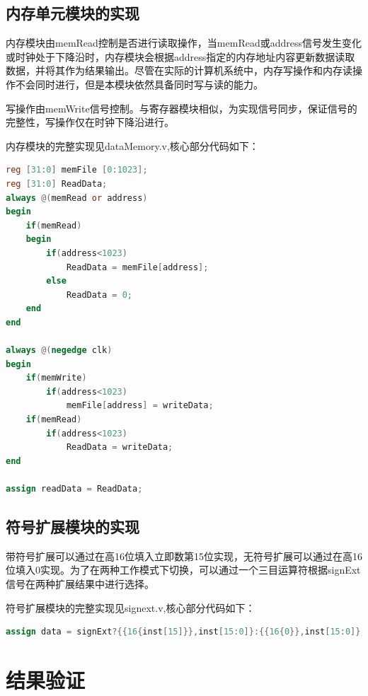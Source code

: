 \documentclass[UTF8]{ctexart}
\begin{document}
\subsection{内存单元模块的实现}
内存模块由memRead控制是否进行读取操作，当memRead或address信号发生变化或时钟处于下降沿时，内存模块会根据address指定的内存地址内容更新数据读取数据，并将其作为结果输出。尽管在实际的计算机系统中，内存写操作和内存读操作不会同时进行，但是本模块依然具备同时写与读的能力。\par
写操作由memWrite信号控制。与寄存器模块相似，为实现信号同步，保证信号的完整性，写操作仅在时钟下降沿进行。\par
内存模块的完整实现见dataMemory.v,核心部分代码如下：
\begin{lstlisting}[language=verilog]
reg [31:0] memFile [0:1023];
reg [31:0] ReadData;
always @(memRead or address) 
begin
    if(memRead)
    begin
        if(address<1023)
            ReadData = memFile[address];
        else
            ReadData = 0;
    end
end

always @(negedge clk)
begin
    if(memWrite)
        if(address<1023)
            memFile[address] = writeData;
    if(memRead)
        if(address<1023)
            ReadData = writeData;
end

assign readData = ReadData;
\end{lstlisting}
\subsection{符号扩展模块的实现}
带符号扩展可以通过在高16位填入立即数第15位实现，无符号扩展可以通过在高16位填入0实现。为了在两种工作模式下切换，可以通过一个三目运算符根据signExt信号在两种扩展结果中进行选择。\par
符号扩展模块的完整实现见signext.v,核心部分代码如下：
\begin{lstlisting}[language=verilog]
assign data = signExt?{{16{inst[15]}},inst[15:0]}:{{16{0}},inst[15:0]};
\end{lstlisting}

\section{结果验证}\label{sec3}
\end{document}
